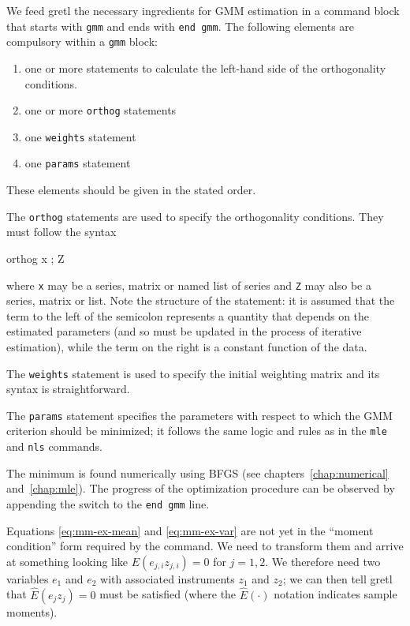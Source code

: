 We feed gretl the necessary ingredients for GMM estimation in a
command block that starts with \texttt{gmm} and ends with \texttt{end
  gmm}. The following elements are compulsory within a \texttt{gmm}
block:
\begin{enumerate}
\item one or more statements to calculate the left-hand side of the
  orthogonality conditions.
\item one or more \texttt{orthog} statements
\item one \texttt{weights} statement
\item one \texttt{params} statement
\end{enumerate}
These elements should be given in the stated order.

The \texttt{orthog} statements are used to specify the orthogonality
conditions.  They must follow the syntax
\begin{code}
  orthog x ; Z
\end{code}
where \texttt{x} may be a series, matrix or named list of series and
\texttt{Z} may also be a series, matrix or list. Note the structure of
the statement: it is assumed that the term to the left of the
semicolon represents a quantity that depends on the estimated
parameters (and so must be updated in the process of iterative
estimation), while the term on the right is a constant function of the
data.

The \texttt{weights} statement is used to specify the initial
weighting matrix and its syntax is straightforward. 

The \texttt{params} statement specifies the parameters with respect to
which the GMM criterion should be minimized; it follows the same logic
and rules as in the \texttt{mle} and \texttt{nls} commands.

The minimum is found numerically using BFGS (see
chapters~\ref{chap:numerical} and~\ref{chap:mle}).  The progress of
the optimization procedure can be observed by appending the
 switch to the \texttt{end gmm} line.

\bigskip

Equations \ref{eq:mm-ex-mean} and \ref{eq:mm-ex-var} are not yet in
the ``moment condition'' form required by the  command. We
need to transform them and arrive at something looking like
$E(e_{j,i} z_{j,i}) = 0$ for $j=1, 2$. We therefore need two variables
$e_1$ and $e_2$ with associated instruments $z_1$ and $z_2$; we can
then tell gretl that $\hat{E}(e_j z_j) = 0$ must be satisfied (where
the $\hat{E}(\cdot)$ notation indicates sample moments).

